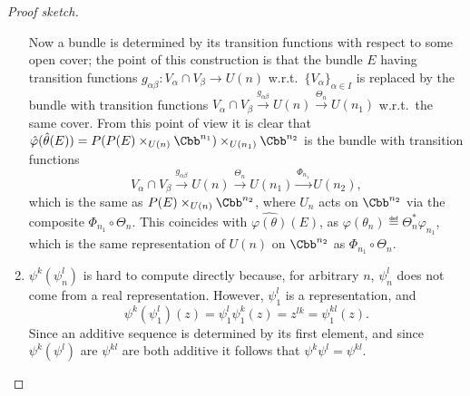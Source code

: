 \begin{proof}[Proof sketch]
\begin{enumerate}
Now a bundle is determined by its transition functions with respect to some open cover; the point of this construction is that the bundle $E$ having transition functions $g_{\alpha \beta}: V_\alpha \cap V_\beta \to U(n)$ w.r.t.\ $\{V_\alpha\}_{\alpha \in I}$ is replaced by the bundle with transition functions $V_\alpha \cap V_\beta \stackrel{g_{\alpha \beta}}{\to} U(n) \stackrel{\Theta_n}{\to} U(n_1)$ w.r.t.\ the same cover.
From this point of view it is clear that $\hat \varphi (\hat \theta(E)) = P(P(E) \times_{U(n)} \Cbb^{n_1}) \times_{U(n_1)} \Cbb^{n_2}$ is the bundle with transition functions \[V_\alpha \cap V_\beta \stackrel{g_{\alpha \beta}}{\to} U(n) \stackrel{\Theta_n}{\to} U(n_1) \stackrel{\Phi_{n_1}}{\to} U(n_2),\] which is the same as  $P(E) \times_{U(n)} \Cbb^{n_2}$, where $U_n$ acts on $\Cbb^{n_2}$ via the composite $\Phi_{n_1}\circ\Theta_n$. This coincides with $\widehat{\varphi(\theta)} (E)$, as $\varphi(\theta_n) \eqdef \Theta_n^*\varphi_{n_1}$, which is the same representation of $U(n)$ on $\Cbb^{n_2}$ as $\Phi_{n_1}\circ\Theta_n$.





%
\item $\psi^k(\psi^l_n)$ is hard to compute directly because, for arbitrary $n$, $\psi^l_n$ does not come from a real representation.  However, $\psi^l_1$ is a representation, and \[\psi^k(\psi^l_1)(z) = \psi^l_1 \psi^k_1(z) = z^{lk} = \psi^{kl}_1(z).\]  Since an additive sequence is determined by its first element, and since $\psi^k(\psi^l)$ are $\psi^{kl}$ are both additive it follows that $\psi^k \psi^l = \psi^{kl}$.\qedhere
\end{enumerate}
\end{proof}
